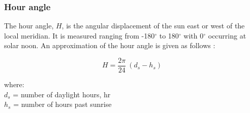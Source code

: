 \subsubsection{Hour angle}
\label{sec:hour}
The hour angle, $H$, is the angular displacement of the sun east or west of the local meridian. 
It is measured ranging from -180$^{\circ}$ to 180$^{\circ}$ with 0$^{\circ}$ occurring at solar noon. 
An approximation of the hour angle is given as follows \parencite{cooper69}:

\begin{equation}
\label{eq:houra}
    H = \frac{2\pi}{24} \: (d_{s} - h_s)
\end{equation}

\noindent where: \\
\indent $d_s$ = number of daylight hours, hr \\
\indent $h_s$ = number of hours past sunrise\\

